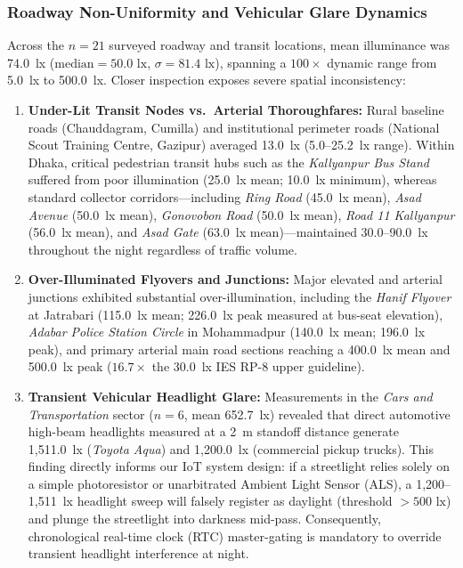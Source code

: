 \documentclass[11pt,a4paper]{article}
\begin{document}
\subsubsection{Roadway Non-Uniformity and Vehicular Glare Dynamics}
Across the \(n = 21\) surveyed roadway and transit locations, mean illuminance was 74.0~lx (\(\text{median} = 50.0\text{ lx}\), \(\sigma = 81.4\text{ lx}\)), spanning a \(100\times\) dynamic range from 5.0~lx to 500.0~lx. Closer inspection exposes severe spatial inconsistency:
\begin{enumerate}
    \item \textbf{Under-Lit Transit Nodes vs.\ Arterial Thoroughfares:} Rural baseline roads (Chauddagram, Cumilla) and institutional perimeter roads (National Scout Training Centre, Gazipur) averaged 13.0~lx (5.0--25.2~lx range). Within Dhaka, critical pedestrian transit hubs such as the \textit{Kallyanpur Bus Stand} suffered from poor illumination (25.0~lx mean; 10.0~lx minimum), whereas standard collector corridors---including \textit{Ring Road} (45.0~lx mean), \textit{Asad Avenue} (50.0~lx mean), \textit{Gonovobon Road} (50.0~lx mean), \textit{Road 11 Kallyanpur} (56.0~lx mean), and \textit{Asad Gate} (63.0~lx mean)---maintained 30.0--90.0~lx throughout the night regardless of traffic volume.
    \item \textbf{Over-Illuminated Flyovers and Junctions:} Major elevated and arterial junctions exhibited substantial over-illumination, including the \textit{Hanif Flyover} at Jatrabari (115.0~lx mean; 226.0~lx peak measured at bus-seat elevation), \textit{Adabar Police Station Circle} in Mohammadpur (140.0~lx mean; 196.0~lx peak), and primary arterial main road sections reaching a 400.0~lx mean and 500.0~lx peak (\(16.7\times\) the 30.0~lx IES RP-8 \cite{ies_rp8} upper guideline).
    \item \textbf{Transient Vehicular Headlight Glare:} Measurements in the \textit{Cars and Transportation} sector (\(n = 6\), mean 652.7~lx) revealed that direct automotive high-beam headlights measured at a 2~m standoff distance generate 1,511.0~lx (\textit{Toyota Aqua}) and 1,200.0~lx (commercial pickup trucks). This finding directly informs our IoT system design: if a streetlight relies solely on a simple photoresistor or unarbitrated Ambient Light Sensor (ALS), a 1,200--1,511~lx headlight sweep will falsely register as daylight (threshold \(>500\text{ lx}\)) and plunge the streetlight into darkness mid-pass. Consequently, chronological real-time clock (RTC) master-gating is mandatory to override transient headlight interference at night.
\end{enumerate}
\end{document}
